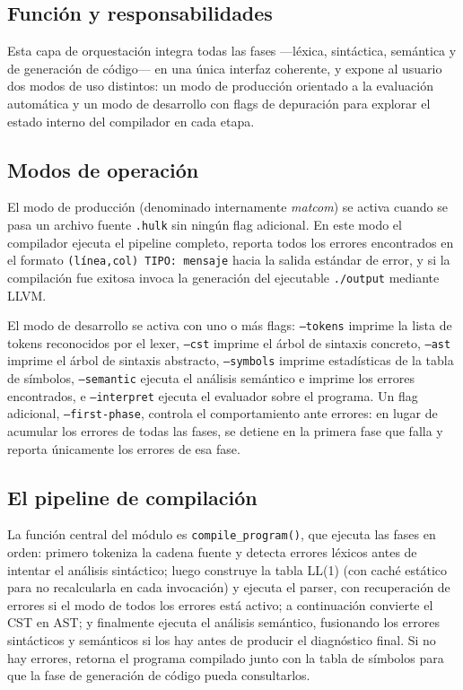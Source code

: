 \documentclass[11pt,a4paper]{article}
\begin{document}
\subsection{Función y responsabilidades}

Esta capa de orquestación integra todas las fases —léxica, sintáctica, semántica y de generación de código— en una única interfaz coherente, y expone al usuario dos modos de uso distintos: un modo de producción orientado a la evaluación automática y un modo de desarrollo con flags de depuración para explorar el estado interno del compilador en cada etapa.

\subsection{Modos de operación}

El modo de producción (denominado internamente \textit{matcom}) se activa cuando se pasa un archivo fuente \texttt{.hulk} sin ningún flag adicional. En este modo el compilador ejecuta el pipeline completo, reporta todos los errores encontrados en el formato \texttt{(línea,col) TIPO: mensaje} hacia la salida estándar de error, y si la compilación fue exitosa invoca la generación del ejecutable \texttt{./output} mediante LLVM.

El modo de desarrollo se activa con uno o más flags: \texttt{--tokens} imprime la lista de tokens reconocidos por el lexer, \texttt{--cst} imprime el árbol de sintaxis concreto, \texttt{--ast} imprime el árbol de sintaxis abstracto, \texttt{--symbols} imprime estadísticas de la tabla de símbolos, \texttt{--semantic} ejecuta el análisis semántico e imprime los errores encontrados, e \texttt{--interpret} ejecuta el evaluador sobre el programa. Un flag adicional, \texttt{--first-phase}, controla el comportamiento ante errores: en lugar de acumular los errores de todas las fases, se detiene en la primera fase que falla y reporta únicamente los errores de esa fase.

\subsection{El pipeline de compilación}

La función central del módulo es \texttt{compile\_program()}, que ejecuta las fases en orden: primero tokeniza la cadena fuente y detecta errores léxicos antes de intentar el análisis sintáctico; luego construye la tabla LL(1) (con caché estático para no recalcularla en cada invocación) y ejecuta el parser, con recuperación de errores si el modo de todos los errores está activo; a continuación convierte el CST en AST; y finalmente ejecuta el análisis semántico, fusionando los errores sintácticos y semánticos si los hay antes de producir el diagnóstico final. Si no hay errores, retorna el programa compilado junto con la tabla de símbolos para que la fase de generación de código pueda consultarlos.
\end{document}
